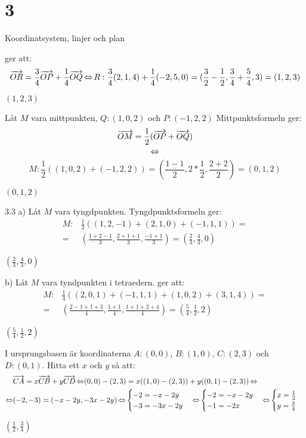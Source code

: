 \chapter{3}{Koordinatsystem, linjer och plan}
\begin{task}{3.1}
	 ger att:
	\[\overrightarrow{OR}=\frac{3}{4}\overrightarrow{OP}+\frac{1}{4}\overrightarrow{OQ} \operatorname{\Leftrightarrow}
	R:\frac{3}{4}(2,1,4)+\frac{1}{4}(-2,5,0)=(\frac{3}{2}-\frac{1}{2},\frac{3}{4}+\frac{5}{4},3)=(1,2,3)\]
	
	\ans $(1,2,3)$
\end{task}

\begin{task}{3.2}
	Låt $M$ vara mittpunkten, $Q:(1,0,2)$ och $P:(-1,2,2)$
	Mittpunktsformeln ger:
	\[\overrightarrow{OM}=\frac{1}{2}(\overrightarrow{OP}+\overrightarrow{OQ})\] 
	\[\operatorname{\Leftrightarrow}\]
	\[M:\frac{1}{2}((1,0,2)+(-1,2,2))=
	(\frac{1-1}{2},2*\frac{1}{2},\frac{2+2}{2})=
	(0,1,2)\]

	\ans $(0,1,2)$
\end{task}

\begin{task}{3.3 a)}
	Låt $M$ vara tyngdpunkten. Tyngdpunktsformeln ger:
	\begin{align*}
		M:&\frac{1}{3}((1,2,-1)+(2,1,0)+(-1,1,1))= \\ =
		&(\frac{1+2-1}{3},\frac{2+1+1}{3},\frac{-1+1}{3})=
		(\frac{2}{3},\frac{4}{3},0)
	\end{align*}

	\ans $(\frac{2}{3},\frac{4}{3},0)$
\end{task}

\begin{task}{b)}
	Låt $M$ vara tyndpunkten i tetraedern.  ger att:
	\begin{align*}
		M:&\frac{1}{4}((2,0,1)+(-1,1,1)+(1,0,2)+(3,1,4))= \\ =
		&(\frac{2-1+1+3}{4},\frac{1+1}{4},\frac{1+1+2+4}{4})=
		(\frac{5}{4},\frac{1}{2},2)
	\end{align*}
	
	\ans $(\frac{5}{4},\frac{1}{2},2)$
\end{task}

\begin{task}{3.4}
	I ursprungsbasen är koordinaterna $A:(0,0)$, $B:(1,0)$, $C:(2,3)$ och $D:(0,1)$.
	Hitta ett $x$ och $y$ så att:
	\begin{align*}
		&\overrightarrow{CA}=x\overrightarrow{CB}+y\overrightarrow{CD} \operatorname{\Leftrightarrow}
		(0,0)-(2,3)=x((1,0)-(2,3))+y((0,1)-(2,3)) \operatorname{\Leftrightarrow} \\ \operatorname{\Leftrightarrow}
		&(-2,-3)=(-x-2y,-3x-2y) \operatorname{\Leftrightarrow}
		\begin{cases}
			-2=-x-2y \\
			-3=-3x-2y
		\end{cases} \operatorname{\Leftrightarrow}
		\begin{cases}
			-2=-x-2y \\
			-1=-2x
		\end{cases} \operatorname{\Leftrightarrow}
		\begin{cases}
			x=\frac{1}{2} \\
			y=\frac{3}{4}
		\end{cases}
	\end{align*}
	
	\ans $(\frac{1}{2},\frac{3}{4})$
\end{task}

